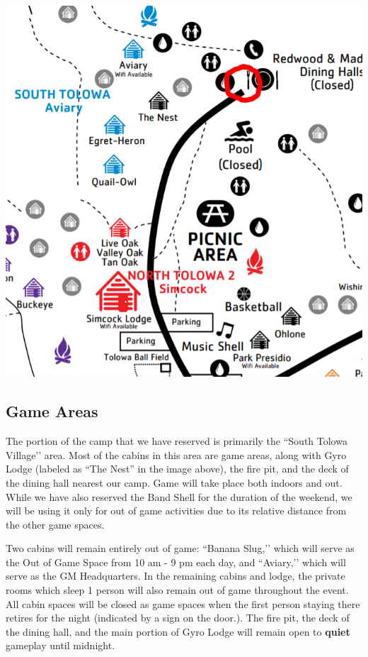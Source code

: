 \documentclass[sheet]{GL2020}
\begin{document}
\begin{center}
\includegraphics[scale=0.5]{CampMap}
\end{center}

\subsection{Game Areas}
The portion of the camp that we have reserved is primarily the ``South Tolowa Village’’ area. Most of the cabins in this area are game areas, along with Gyro Lodge (labeled as ``The Nest'' in the image above), the fire pit, and the deck of the dining hall nearest our camp. Game will take place both indoors and out. While we have also reserved the Band Shell for the duration of the weekend, we will be using it only for out of game activities due to its relative distance from the other game spaces.

Two cabins will remain entirely out of game: ``Banana Slug,’’ which will serve as the Out of Game Space from 10 am - 9 pm each day, and ``Aviary,’’ which will serve as the GM Headquarters. In the remaining cabins and lodge, the private rooms which sleep 1 person will also remain out of game throughout the event. All cabin spaces will be closed as game spaces when the first person staying there retires for the night (indicated by a sign on the door.). The fire pit, the deck of the dining hall, and the main portion of Gyro Lodge will remain open to \textbf{quiet} gameplay until midnight.
\end{document}
